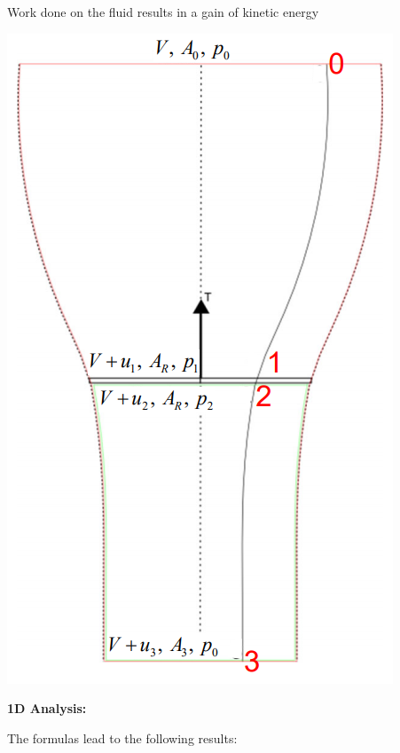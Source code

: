 \documentclass[fontsize=6pt,DIV=calc,a4paper,ngerman]{scrartcl}
\begin{document}
\begin{multicols*}{4}
\begin{minipage}{0.38\linewidth}
		\bigskip
		Work done on the fluid results in a gain of kinetic energy

	\end{minipage}

	\smallskip
	\begin{minipage}{0.35\linewidth}
		\includegraphics[width=\linewidth]{1danalysis.png}
	\end{minipage}\hfill
	\begin{minipage}{0.6\linewidth}
		\textbf{1D Analysis:}

		\medskip
		The formulas lead to the following results:


\end{minipage}
\end{multicols*}
\end{document}
